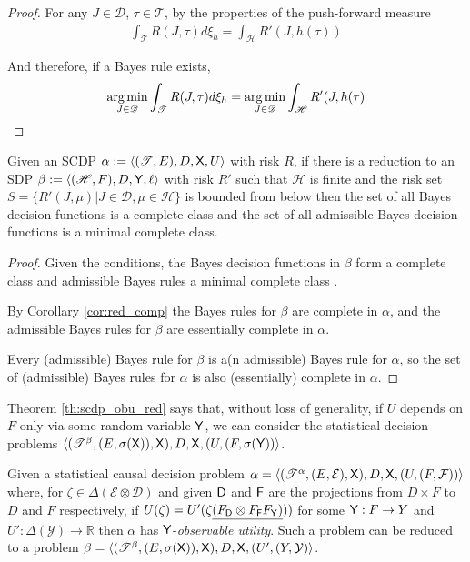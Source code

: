 \begin{proof}
For any $J\in\mathscr{D}$, $\tau\in \mathscr{T}$, by the properties of the push-forward measure
\begin{align}
    \int_{\mathscr{T}} R(J,\tau) d\xi_h = \int_\mathscr{H} R'(J,h(\tau))
\end{align}

And therefore, if a Bayes rule exists,
\begin{align}
    \operatorname*{arg\,min}_{J\in\mathscr{D}} \int_{\mathscr{T}} R(J,\tau) d\xi_h =  \operatorname*{arg\,min}_{J\in\mathscr{D}}\int_\mathscr{H} R'(J,h(\tau)
\end{align}

\end{proof}

\begin{theorem}\label{th:complete_class}
Given an SCDP $\alpha:=\langle (\mathscr{T},E),D,\mathsf{X},U\rangle$ with risk $R$, if there is a reduction to an SDP $\beta:=\langle (\mathscr{H},F),D,\mathsf{Y},\ell \rangle$ with risk $R'$ such that $\mathscr{H}$ is finite and the risk set $S=\{R'(J,\mu)|J\in\mathscr{D},\mu\in \mathscr{H}\}$ is bounded from below then the set of all Bayes decision functions is a complete class and the set of all admissible Bayes decision functions is a minimal complete class.
\end{theorem}

\begin{proof}
Given the conditions, the Bayes decision functions in $\beta$ form a complete class and admissible Bayes rules a minimal complete class \cite{toutenburg_ferguson_1970}.

By Corollary \ref{cor:red_comp} the Bayes rules for $\beta$ are complete in $\alpha$, and the admissible Bayes rules for $\beta$ are essentially complete in $\alpha$.

Every (admissible) Bayes rule for $\beta$ is a(n admissible) Bayes rule for $\alpha$, so the set of (admissible) Bayes rules for $\alpha$ is also (essentially) complete in $\alpha$.
\end{proof}


Theorem \ref{th:scdp_obu_red} says that, without loss of generality, if $U$ depends on $F$ only via some random variable $\mathsf{Y}$, we can consider the statistical decision problems $\langle (\mathscr{T}^\beta,(E,\sigma(\mathsf{X})),\mathsf{X}),D,\mathsf{X},(U,(F,\sigma(\mathsf{Y}))\rangle$.

\begin{theorem}\label{th:scdp_obu_red}
Given a statistical causal decision problem $\alpha=\langle (\mathscr{T}^\alpha,(E,\mathcal{E}),\mathsf{X}),D,\mathsf{X},(U,(F,\mathcal{F}))\rangle$ where, for $\zeta\in \Delta(\mathcal{E}\otimes\mathcal{D})$ and given $\mathsf{D}$ and $\mathsf{F}$ are the projections from $D\times F$ to $D$ and $F$ respectively, if $U(\zeta)=U'(\zeta\underline{(F_{\mathsf{D}}\otimes F_{\mathsf{F}} F_{\mathsf{Y}})} ))$ for some $\mathsf{Y}: F\to Y$ and $U':\Delta(\mathcal{Y})\to \mathbb{R}$ then $\alpha$ has $\mathsf{Y}$-\emph{observable utility}. Such a problem can be reduced to a problem $\beta=\langle (\mathscr{T}^\beta,(E,\sigma(\mathsf{X})),\mathsf{X}),D,\mathsf{X},(U',(Y,\mathcal{Y})\rangle$.
\end{theorem}

